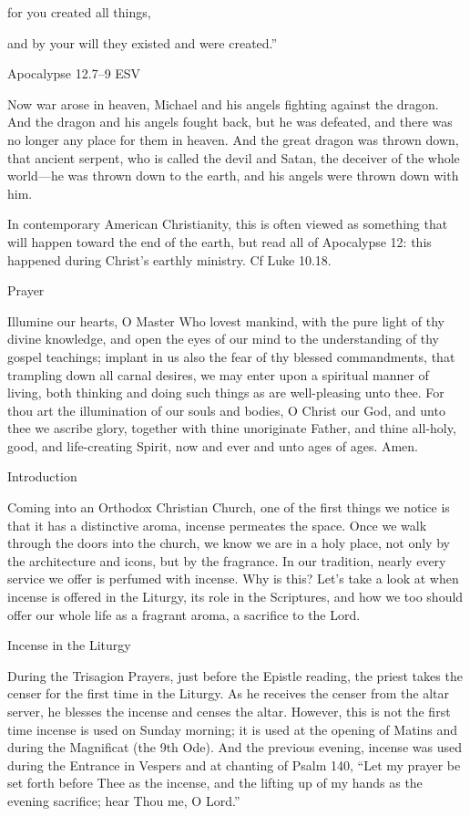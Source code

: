 \documentclass[
]{article}
\begin{document}
for you created all things,

and by your will they existed and were created.''

Apocalypse 12.7--9 ESV

Now war arose in heaven, Michael and his angels fighting against the
dragon. And the dragon and his angels fought back, but he was defeated,
and there was no longer any place for them in heaven. And the great
dragon was thrown down, that ancient serpent, who is called the devil
and Satan, the deceiver of the whole world---he was thrown down to the
earth, and his angels were thrown down with him.

In contemporary American Christianity, this is often viewed as something
that will happen toward the end of the earth, but read all of Apocalypse
12: this happened during Christ's earthly ministry. Cf Luke 10.18.

Prayer

Illumine our hearts, O Master Who lovest mankind, with the pure light of
thy divine knowledge, and open the eyes of our mind to the understanding
of thy gospel teachings; implant in us also the fear of thy blessed
commandments, that trampling down all carnal desires, we may enter upon
a spiritual manner of living, both thinking and doing such things as are
well-pleasing unto thee. For thou art the illumination of our souls and
bodies, O Christ our God, and unto thee we ascribe glory, together with
thine unoriginate Father, and thine all-holy, good, and life-creating
Spirit, now and ever and unto ages of ages. Amen.

Introduction

Coming into an Orthodox Christian Church, one of the first things we
notice is that it has a distinctive aroma, incense permeates the space.
Once we walk through the doors into the church, we know we are in a holy
place, not only by the architecture and icons, but by the fragrance. In
our tradition, nearly every service we offer is perfumed with incense.
Why is this? Let's take a look at when incense is offered in the
Liturgy, its role in the Scriptures, and how we too should offer our
whole life as a fragrant aroma, a sacrifice to the Lord.

Incense in the Liturgy

During the Trisagion Prayers, just before the Epistle reading, the
priest takes the censer for the first time in the Liturgy. As he
receives the censer from the altar server, he blesses the incense and
censes the altar. However, this is not the first time incense is used on
Sunday morning; it is used at the opening of Matins and during the
Magnificat (the 9th Ode). And the previous evening, incense was used
during the Entrance in Vespers and at chanting of Psalm 140, ``Let my
prayer be set forth before Thee as the incense, and the lifting up of my
hands as the evening sacrifice; hear Thou me, O Lord.''
\end{document}

